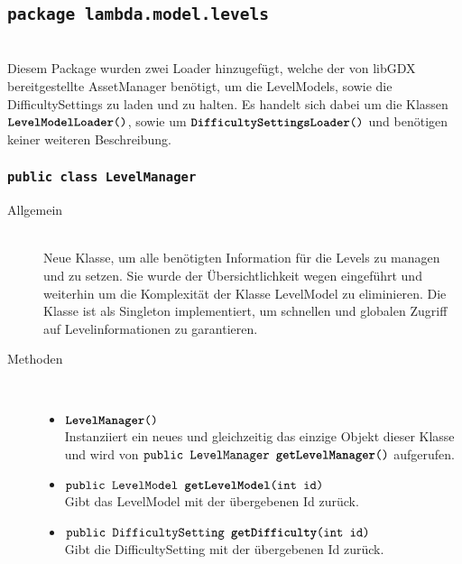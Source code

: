 \subsection{\texttt{package lambda.model.levels}}

\item[Allgemein] \hfill \\ Diesem Package wurden zwei Loader hinzugefügt, welche der von libGDX bereitgestellte AssetManager benötigt, um die LevelModels, sowie die DifficultySettings zu laden und zu halten. Es handelt sich dabei um die Klassen $\texttt{\textbf{LevelModelLoader}()}$, sowie um $\texttt{\textbf{DifficultySettingsLoader}()}$ und benötigen keiner weiteren Beschreibung.

\subsubsection{\normalfont \texttt{public class \textbf{LevelManager}}}

\begin{description}

\item[Allgemein] \hfill \\ Neue Klasse, um alle benötigten Information für die Levels zu managen und zu setzen. Sie wurde der Übersichtlichkeit wegen eingeführt und weiterhin um die Komplexität der Klasse LevelModel zu eliminieren. Die Klasse ist als Singleton implementiert, um schnellen und globalen Zugriff auf Levelinformationen zu garantieren.
\item[Methoden] \hfill \\
	\vspace{-.8cm}
	\begin{itemize}
		\item $\texttt{\textbf{LevelManager}()}$ \\ Instanziiert ein neues und gleichzeitig das einzige Objekt dieser Klasse und wird von $\texttt{public LevelManager \textbf{getLevelManager}()}$ aufgerufen.
		\item $\texttt{public LevelModel \textbf{getLevelModel}(int id)}$ \\ Gibt das LevelModel mit der übergebenen Id zurück.
		\item $\texttt{public DifficultySetting \textbf{getDifficulty}(int id)}$ \\ Gibt die DifficultySetting mit der übergebenen Id zurück.
	\end{itemize}
\end{description}

